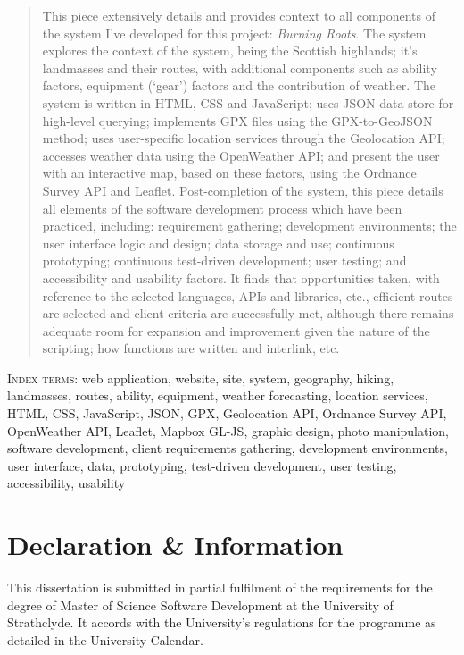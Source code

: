 \documentclass[11pt, english]{article}
\begin{document}
	\begin{abstract}
		This piece extensively details and provides context to all components of the system I've developed for this project: \textit{Burning Roots}. The system explores the context of the system, being the Scottish highlands; it's landmasses and their routes, with additional components such as ability factors, equipment (`gear') factors and the contribution of weather. The system is written in HTML, CSS and JavaScript; uses JSON data store for high-level querying; implements GPX files using the GPX-to-GeoJSON method; uses user-specific location services through the Geolocation API; accesses weather data using the OpenWeather API; and present the user with an interactive map, based on these factors, using the Ordnance Survey API and Leaflet. Post-completion of the system, this piece details all elements of the software development process which have been practiced, including: requirement gathering; development environments; the user interface logic and design; data storage and use; continuous prototyping; continuous test-driven development; user testing; and accessibility and usability factors. It finds that opportunities taken, with reference to the selected languages, APIs and libraries, etc., efficient routes are selected and client criteria are successfully met, although there remains adequate room for expansion and improvement given the nature of the scripting; how functions are written and interlink, etc.
	\end{abstract}

	\textsc{Index terms}: web application, website, site, system, geography, hiking, landmasses, routes, ability, equipment, weather forecasting, location services, HTML, CSS, JavaScript, JSON, GPX, Geolocation API, Ordnance Survey API, OpenWeather API, Leaflet, Mapbox GL-JS, graphic design, photo manipulation, software development, client requirements gathering, development environments, user interface, data, prototyping, test-driven development, user testing, accessibility, usability

\newpage

	\section*{Declaration \& Information}

	This dissertation is submitted in partial fulfilment of the requirements for the degree of Master of Science Software Development at the University of Strathclyde. It accords with the University’s regulations for the programme as detailed in the University Calendar.
\end{document}
